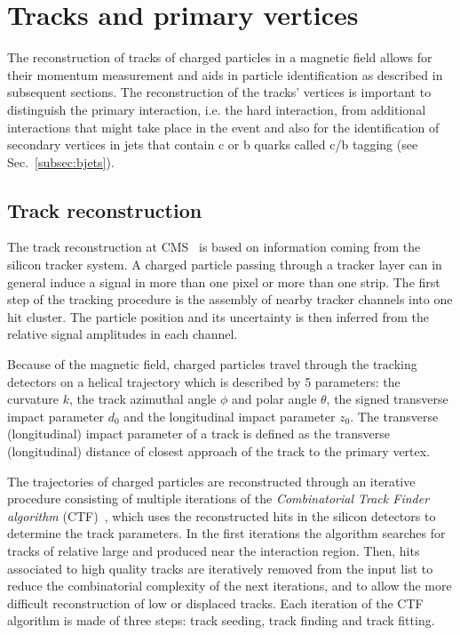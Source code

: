 \section{Tracks and primary vertices}\label{sec:tracksandvtx}

The reconstruction of tracks of charged particles in a magnetic field allows for their momentum measurement and aids in particle identification as described in subsequent sections. The reconstruction of the tracks' vertices is important to distinguish the primary interaction, i.e. the hard interaction, from additional interactions that might take place in the event and also for the identification of secondary vertices in jets that contain c or b quarks called c/b tagging (see Sec.~\ref{subsec:bjets}).

\subsection{Track reconstruction}\label{subsec:tracks}

The track reconstruction at CMS~\cite{Chatrchyan:2014fea} is based on information coming from the silicon tracker system. A charged particle passing through a tracker layer can in general induce a signal in more than one pixel or more than one strip. The first step of the tracking procedure is the assembly of nearby tracker channels into one hit cluster. The particle position and its uncertainty is then inferred from the relative signal amplitudes in each channel.

Because of the magnetic field, charged particles travel through the tracking detectors on a helical trajectory which is described by 5 parameters: the curvature $k$, the track azimuthal angle $\phi$ and polar angle $\theta$, the signed transverse impact parameter $d_0$ and the longitudinal impact parameter $z_0$. The transverse (longitudinal) impact parameter of a track is defined as the transverse (longitudinal) distance of closest approach of the track to the primary vertex.

The trajectories of charged particles are reconstructed through an iterative procedure consisting of multiple iterations of the \textit{Combinatorial Track Finder algorithm} (CTF)~\cite{Adam:934067}, which uses the reconstructed hits in the silicon detectors to determine the track parameters. In the first iterations the algorithm searches for tracks of relative large \pt and produced near the interaction region. Then, hits associated to high quality tracks are iteratively removed from the input list to reduce the combinatorial complexity of the next iterations, and to allow the more difficult reconstruction of low \pt or displaced tracks. Each iteration of the CTF algorithm is made of three steps: track seeding, track finding and track fitting.

